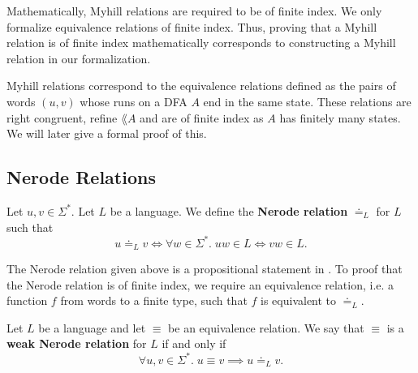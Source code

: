 Mathematically, Myhill relations are required to be of finite index. 
We only formalize equivalence relations of finite index.
Thus, proving that a Myhill relation is of finite index mathematically corresponds 
to constructing a Myhill relation in our formalization.



Myhill relations correspond to the equivalence relations 
defined as the pairs of words $(u, v)$ whose runs on a DFA $A$ end in the same state. 
These relations are right congruent, refine $\lang{A}$ and are of finite index as $A$ has finitely many states. 
We will later give a formal proof of this.

\subsection{Nerode Relations}

\begin{definition}
    \label{suffix_equal}
    Let $u, v \in \Sigma^*$. Let $L$ be a language. We define the \textbf{Nerode relation} $\doteq_L$ for $L$ such that 
    \begin{equation*}
        u \doteq_L v \iff \forall w \in \Sigma^*. \; uw \in L \Leftrightarrow vw \in L. 
    \end{equation*}
\end{definition}


The Nerode relation given above is a propositional statement in \coq. 
To proof that the Nerode relation is of finite index, 
we require an equivalence relation, 
i.e. a function $f$ from words to a finite type,
such that $f$ is equivalent to $\doteq_L$.


\begin{definition}
    \label{Weak_Nerode_Rel}
    Let $L$ be a language and let $\equiv$ be an equivalence relation. We say that $\equiv$ is a \textbf{weak Nerode relation} for $L$ if and only if
    \begin{equation*}
        \forall u, v \in \Sigma^*. \; u \equiv v \implies u \doteq_L v.
    \end{equation*}
\end{definition}


